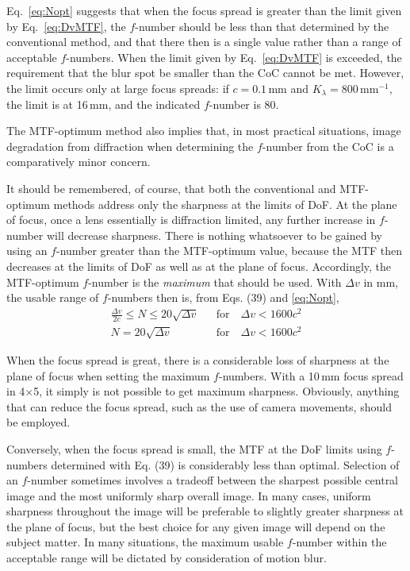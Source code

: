 \documentclass[11pt, oneside]{scrartcl}   	%
\newcommand{\Dv}{\ensuremath{\Delta v}}
\begin{document}
Eq.~\ref{eq:Nopt} suggests that when the focus spread is greater than the limit given by Eq.~\ref{eq:DvMTF}, the $f$-number should be less than that determined by the conventional method, and that there then is a single value rather than a range of acceptable $f$-numbers. When the limit given by Eq.~\ref{eq:DvMTF} is exceeded, the requirement that the blur spot be smaller than the CoC cannot be met. However, the limit occurs only at large focus spreads: if $c = 0.1$\,mm and $K_λ = 800\,\mathrm{mm}^{-1}$, the limit is at 16\,mm, and the indicated $f$-number is 80.

The MTF-optimum method also implies that, in most practical situations, image degradation from diffraction when determining the $f$-number from the CoC is a comparatively minor concern.

It should be remembered, of course, that both the conventional and
MTF-optimum methods address only the sharpness at the limits of
DoF. At the plane of focus, once a lens essentially is diffraction
limited, any further increase in $f$-number will decrease
sharpness. There is nothing whatsoever to be gained by using an
$f$-number greater than the MTF-optimum value, because the MTF then
decreases at the limits of DoF as well as at the plane of
focus. Accordingly, the MTF-optimum $f$-number is the \emph{maximum} that
should be used. With $\Dv$ in mm, the usable range of
$f$-numbers then is, from Eqs. (39) and \ref{eq:Nopt},
\begin{eqnarray}
   \frac{\Dv}{2c} \leq N \leq 20\sqrt{\Dv}& &\mathrm{for}\quad\Dv<1600c^2 \\
   N = 20\sqrt{\Dv}& &\mathrm{for}\quad\Dv<1600c^2
   \label{eq:Nusable}  
\end{eqnarray}

When the focus spread is great, there is a considerable loss of sharpness at the plane of focus when setting the maximum $f$-numbers. With a 10\,mm focus spread in 4$\times$5, it simply is not possible to get maximum sharpness. Obviously, anything that can reduce the focus spread, such as the use of camera movements, should be employed.

Conversely, when the focus spread is small, the MTF at the DoF limits using $f$-numbers determined with Eq. (39) is considerably less than optimal. Selection of an $f$-number sometimes involves a tradeoff between the sharpest possible central image and the most uniformly sharp overall image. In many cases, uniform sharpness throughout the image will be preferable to slightly greater sharpness at the plane of focus, but the best choice for any given image will depend on the subject matter. In many situations, the maximum usable $f$-number within the acceptable range will be dictated by consideration of motion blur.
\end{document}
